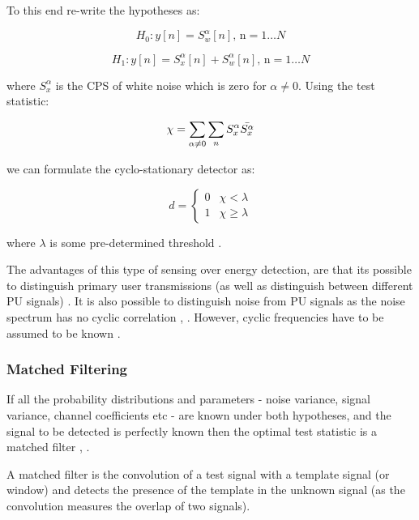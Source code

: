 To this end re-write the hypotheses as:

\begin{equation}
H_{0}: y\left[n\right] = S_{w}^\alpha \left[n\right] \text{, n} =  1 \ldots N 
\end{equation}
\label{c1}

\begin{equation}
H_{1}: y\left[n \right] = S_{x}^{\alpha} \left[n\right] + S_{w}^{\alpha} \left[n\right] \text{, n} =  1 \ldots N 
\end{equation}
\label{c2}

where \(S_{x}^{\alpha}\) is the CPS of white noise which is zero for \(\alpha \neq 0 \).  Using the test statistic:

\begin{equation}
\chi = \sum_{\alpha \neq 0} \sum_{n} S_{x}^{\alpha} \bar{S_{x}^{\alpha}}
\end{equation}

we can formulate the cyclo-stationary detector as:

\begin{equation}
 d =
  \begin{cases}
   0 & \chi < \lambda  \\
   1 & \chi \geq \lambda
  \end{cases}
\end{equation}

where \(\lambda\) is some pre-determined threshold \cite{Ghozzi2006}. 

The advantages of this type of sensing over energy detection, are that its possible to distinguish primary user transmissions (as well as distinguish between different PU signals) \cite{lunden2007spectrum}. It is also possible to distinguish noise from PU signals as the noise spectrum has no cyclic correlation \cite{cabric2004implementation}, \cite{vcabric2005physical}. However, cyclic frequencies have to be assumed to be known \cite{Ghozzi2006}. 

\subsubsection{Matched Filtering}
If all the probability distributions and parameters  - noise variance, signal variance, channel coefficients etc - are known under both hypotheses, and the signal to be detected is perfectly known then the optimal test statistic is a matched filter \cite{cabric2004implementation}, \cite{yucek2009survey}.

A matched filter is the convolution of a test signal with a template signal (or window) and detects the presence of the template in the unknown signal (as the convolution measures the overlap of two signals).

